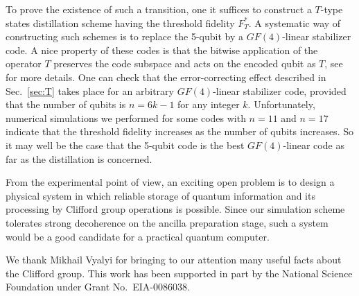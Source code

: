 \documentclass[pra,twocolumn,showpacs]{revtex4}
\newcommand{\Tt}{$T$}
\begin{document}
To prove the existence of such a transition, one it suffices to construct a
\Tt-type states distillation scheme having the threshold fidelity $F_T^*$. A
systematic way of constructing such schemes is to replace the 5-qubit by a
$GF(4)$-linear stabilizer code.  A nice property of these codes is that the
bitwise application of the operator $T$ preserves the code subspace and acts
on the encoded qubit as $T$, see~\cite{CRSS96} for more details.  One can
check that the error-correcting effect described in Sec.~\ref{sec:T} takes
place for an arbitrary $GF(4)$-linear stabilizer code, provided that the
number of qubits is $n=6k-1$ for any integer $k$.  Unfortunately, numerical
simulations we performed for some codes with $n=11$ and $n=17$ indicate that the
threshold fidelity increases as the number of qubits increases.  So it may
well be the case that the 5-qubit code is the best $GF(4)$-linear code as far
as the distillation is concerned.

From the experimental point of view, an exciting open problem is to design a
physical system in which reliable storage of quantum information and its
processing by Clifford group operations is possible. Since our simulation
scheme tolerates strong decoherence on the ancilla preparation stage, such a
system would be a good candidate for a practical quantum computer.

\begin{acknowledgments}
We thank Mikhail Vyalyi for bringing to our attention many useful facts about
the Clifford group. This work has been supported in part by the National
Science Foundation under Grant No.\ EIA-0086038.
\end{acknowledgments}

\appendix
\end{document}
